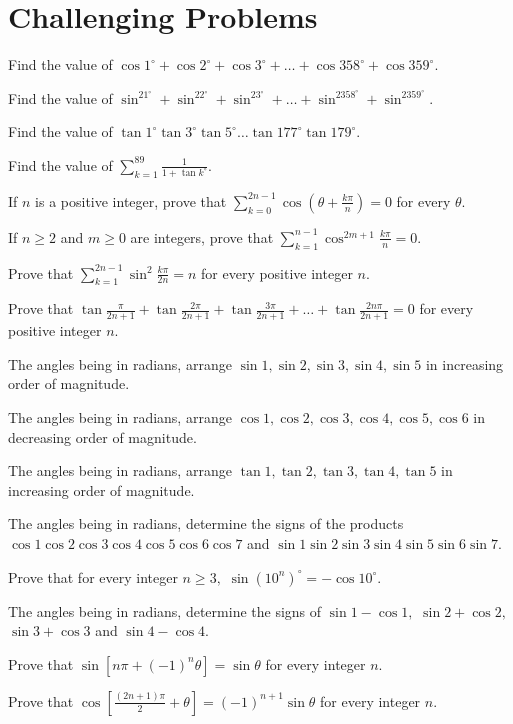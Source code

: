 \section{Challenging Problems}
\startitemize[n, 1*broad]
\item Find the value of $\cos 1^\circ + \cos 2^\circ + \cos 3^\circ + \ldots + \cos 358^\circ + \cos 359^\circ.$
\item Find the value of $\sin^21^\circ + \sin^22^\circ + \sin^23^\circ + \ldots + \sin^2358^\circ + \sin^2359^\circ.$
\item Find the value of $\tan 1^\circ\tan 3^\circ\tan 5^\circ \ldots \tan 177^\circ\tan 179^\circ.$
\item Find the value of $\sum_{k = 1}^{89}\frac{1}{1 + \tan k^\circ}.$
\item If $n$ is a positive integer, prove that $\sum_{k = 0}^{2n - 1}\cos\left(\theta + \frac{k\pi}{n}\right) = 0$ for every
  $\theta.$
\item If $n \geq 2$ and $m \geq 0$ are integers, prove that $\sum_{k = 1}^{n - 1}\cos^{2m + 1}\frac{k\pi}{n} = 0.$
\item Prove that $\sum_{k = 1}^{2n - 1}\sin^2\frac{k\pi}{2n} = n$ for every positive integer $n.$
\item Prove that $\tan\frac{\pi}{2n + 1} + \tan\frac{2\pi}{2n + 1} + \tan\frac{3\pi}{2n + 1} + \ldots + \tan\frac{2n\pi}{2n +
    1} = 0$ for every positive integer $n.$
\item The angles being in radians, arrange $\sin 1, \sin 2, \sin 3, \sin 4, \sin 5$ in increasing order of magnitude.
\item The angles being in radians, arrange $\cos 1, \cos 2, \cos 3, \cos 4, \cos 5, \cos 6$ in decreasing order of magnitude.
\item The angles being in radians, arrange $\tan 1, \tan 2, \tan 3, \tan 4, \tan 5$ in increasing order of magnitude.
\item The angles being in radians, determine the signs of the products $\cos 1\cos 2\cos 3\cos 4\cos 5\cos 6\cos 7$ and $\sin
  1\sin 2\sin 3\sin 4\sin 5\sin 6\sin 7.$
\item Prove that for every integer $n \geq 3,$ $\sin\left(10^n\right)^\circ = -\cos 10^\circ.$
\item The angles being in radians, determine the signs of $\sin 1 - \cos 1,$ $\sin 2 + \cos 2,$ $\sin 3 + \cos 3$ and $\sin 4
  - \cos 4.$
\item Prove that $\sin\left[n\pi + (-1)^n\theta\right] = \sin\theta$ for every integer $n.$
\item Prove that $\cos\left[\frac{(2n + 1)\pi}{2} + \theta\right] = (-1)^{n + 1}\sin\theta$ for every integer $n.$
